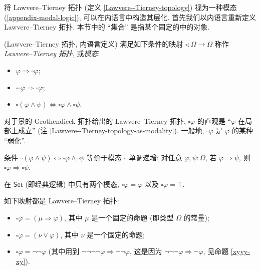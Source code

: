 将 Lawvere--Tierney 拓扑 (定义 \ref{Lawvere--Tierney-topology}) 视为一种模态 (\ref{appendix-modal-logic}), 可以在内语言中构造其层化. 首先我们以内语言重新定义 Lawvere--Tierney 拓扑. 本节中的 ``集合'' 是指某个固定的\topos{}中的对象.

\begin{definition}
	{(Lawvere--Tierney 拓扑, 内语言定义)}
	满足如下条件的映射 $\square\colon \Omega\to\Omega$ 称作\emph{Lawvere--Tierney 拓扑}, 或\emph{模态}:
	\begin{itemize}
		\item $\varphi\Rightarrow \square \varphi$;
		\item $\square\square\varphi \Rightarrow \square\varphi$;
		\item $\square(\varphi \land \psi) \Leftrightarrow \square\varphi\land \square\psi$.
	\end{itemize}
\end{definition}

对于景的 Grothendieck 拓扑给出的 Lawvere--Tierney 拓扑, $\square \varphi$ 的直观是 ``$\varphi$ 在局部上成立'' (注 \ref{Lawvere--Tierney-topology-as-modality}).
一般地, $\square \varphi$ 是 $\varphi$ 的某种 ``弱化''.

条件 $\square(\varphi \land \psi) \Leftrightarrow \square\varphi\land \square\psi$ 等价于模态 $\square$ 单调递增:
对任意 $\varphi,\psi \colon \Omega$,
若 $\varphi \Rightarrow \psi$,
则 $\square\varphi \Rightarrow \square \psi$.


\begin{example}
	{}
	在 $\mathsf {Set}$ (即经典逻辑) 中只有两个模态, $\square \varphi = \varphi$ 以及 $\square \varphi = \top$.
\end{example}

\begin{example}
	[label={internal-Lawvere--Tierney-examples}]
	{}
	如下映射都是 Lawvere--Tierney 拓扑:
	\begin{itemize}
		\item $\square\varphi = (\mu\Rightarrow\varphi)$, 其中 $\mu$ 是一个固定的命题 (即类型 $\Omega$ 的常量);
		\item $\square\varphi = (\nu\lor\varphi)$, 其中 $\nu$ 是一个固定的命题;
		\item $\square\varphi = \neg\neg\varphi$ (其中用到 $\neg\neg\neg\neg\varphi \Rightarrow \neg\neg\varphi$, 这是因为 $\neg\neg\neg\varphi\Rightarrow\neg\varphi$, 见命题 \ref{xyyy-xy}).
	\end{itemize}
\end{example}

